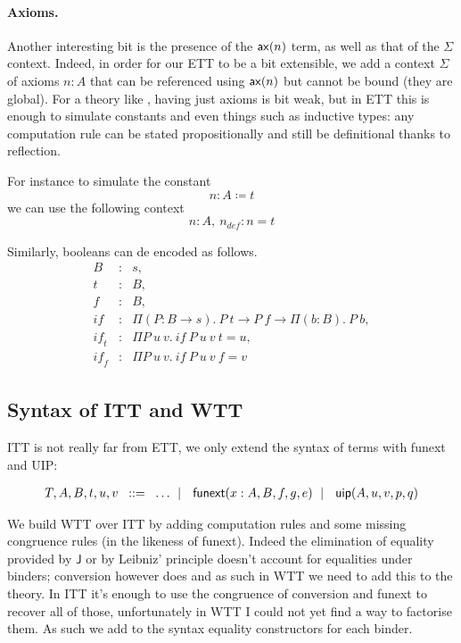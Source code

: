 \paragraph{Axioms.}

Another interesting bit is the presence of the \(\mathsf{ax}(n)\) term, as well as
that of the \(\Sigma\) context. Indeed, in order for our \acrshort{ETT} to be
a bit extensible, we add a context \(\Sigma\) of axioms \(n : A\) that can be
referenced using \(\mathsf{ax}(n)\) but cannot be bound (they are global).
For a theory like \Coq, having just axioms is bit weak, but in \acrshort{ETT}
this is enough to simulate constants and even things such as inductive types:
any computation rule can be stated propositionally and still be definitional
thanks to reflection.

For instance to simulate the constant
\[
  n : A \coloneqq t
\]
we can use the following context
\[
  n : A,\ n_{\mathit{def}} : n = t
\]

Similarly, booleans can de encoded as follows.
\[
  \begin{array}{lcl}
    B &:& s, \\
    t &:& B, \\
    f &:& B, \\
    \mathit{if} &:& \Pi (P : B \to s).\ P\ t \to P\ f \to \Pi (b : B).\ P\ b, \\
    \mathit{if_t} &:& \Pi P\ u\ v.\ \mathit{if}\ P\ u\ v\ t = u, \\
    \mathit{if_f} &:& \Pi P\ u\ v.\ \mathit{if}\ P\ u\ v\ f = v
  \end{array}
\]

\subsection{Syntax of \acrshort{ITT} and \acrshort{WTT}}

\acrshort{ITT} is not really far from \acrshort{ETT}, we only extend the syntax
of terms with \acrshort{funext} and \acrshort{UIP}:

\[
  \begin{array}{l@{~\,}r@{~\,}l}
    T,A,B,t,u,v &\bnf& \dots \bnfor \funext{x:A}{B}{f}{g}{e} \bnfor
    \uip{A}{u}{v}{p}{q}
  \end{array}
\]

We build \acrshort{WTT} over \acrshort{ITT} by adding computation rules
and some missing congruence rules (in the likeness of \acrshort{funext}).
Indeed the elimination of equality provided by \(\mathsf{J}\) or by Leibniz'
principle doesn't account for equalities under binders; conversion however does
and as such in \acrshort{WTT} we need to add this to the theory.
In \acrshort{ITT} it's enough to use the congruence of conversion and
\acrshort{funext} to recover all of those, unfortunately in \acrshort{WTT} I
could not yet find a way to factorise them. As such we add to the syntax
equality constructors for each binder.

